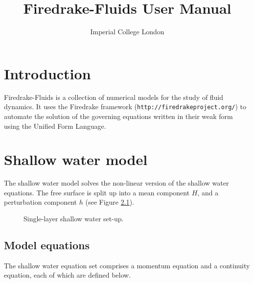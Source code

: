 \documentclass[a4paper,11pt]{report}
\title{Firedrake-Fluids User Manual}
\author{Imperial College London}
\begin{document}
\maketitle
\tableofcontents

\setlength{\parskip}{0.3cm}
\setlength{\parindent}{0cm}

\chapter{Introduction}
Firedrake-Fluids is a collection of numerical models for the study of fluid dynamics. It uses the Firedrake framework (\texttt{http://firedrakeproject.org/}) to automate the solution of the governing equations written in their weak form using the Unified Form Language.

\chapter{Shallow water model}
The shallow water model solves the non-linear version of the shallow water equations. The free surface is split up into a mean component $H$, and a perturbation component $h$ (see Figure \ref{fig:shallow_water_setup}).

\begin{figure}
   \centering
      \caption{Single-layer shallow water set-up.}
      \label{fig:shallow_water_setup}
   \end{figure}


\section{Model equations}
The shallow water equation set comprises a momentum equation and a continuity equation, each of which are defined below.
\end{document}
